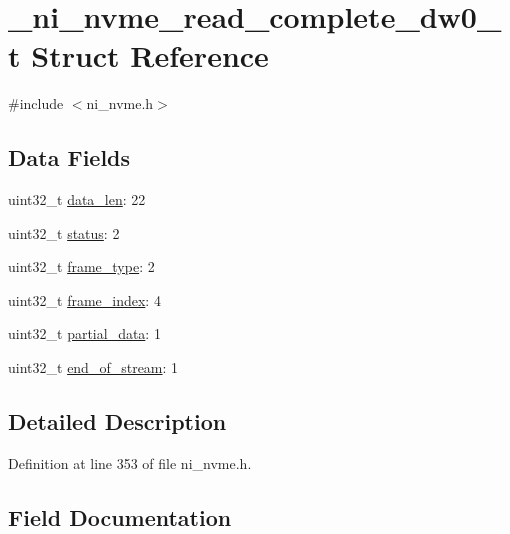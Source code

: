 \hypertarget{struct__ni__nvme__read__complete__dw0__t}{}\section{\+\_\+ni\+\_\+nvme\+\_\+read\+\_\+complete\+\_\+dw0\+\_\+t Struct Reference}
\label{struct__ni__nvme__read__complete__dw0__t}


{\ttfamily \#include $<$ni\+\_\+nvme.\+h$>$}

\subsection*{Data Fields}
\begin{DoxyCompactItemize}
\item 
uint32\+\_\+t \mbox{\hyperlink{struct__ni__nvme__read__complete__dw0__t_a231d88a2076c53df88d8ffd7eb1c50ec}{data\+\_\+len}}\+: 22
\item 
uint32\+\_\+t \mbox{\hyperlink{struct__ni__nvme__read__complete__dw0__t_ade20423e91627f07e610924cb0081623}{status}}\+: 2
\item 
uint32\+\_\+t \mbox{\hyperlink{struct__ni__nvme__read__complete__dw0__t_acf47f9b2777759386086e94ed5962f19}{frame\+\_\+type}}\+: 2
\item 
uint32\+\_\+t \mbox{\hyperlink{struct__ni__nvme__read__complete__dw0__t_a05f60adb7ca73495905c236f23d474d6}{frame\+\_\+index}}\+: 4
\item 
uint32\+\_\+t \mbox{\hyperlink{struct__ni__nvme__read__complete__dw0__t_adc27b66583196e08fc67292224c95865}{partial\+\_\+data}}\+: 1
\item 
uint32\+\_\+t \mbox{\hyperlink{struct__ni__nvme__read__complete__dw0__t_a7cd60f79487efa52ff89303532a085fb}{end\+\_\+of\+\_\+stream}}\+: 1
\end{DoxyCompactItemize}


\subsection{Detailed Description}


Definition at line 353 of file ni\+\_\+nvme.\+h.



\subsection{Field Documentation}
\mbox{\label{struct__ni__nvme__read__complete__dw0__t_a231d88a2076c53df88d8ffd7eb1c50ec}} 

